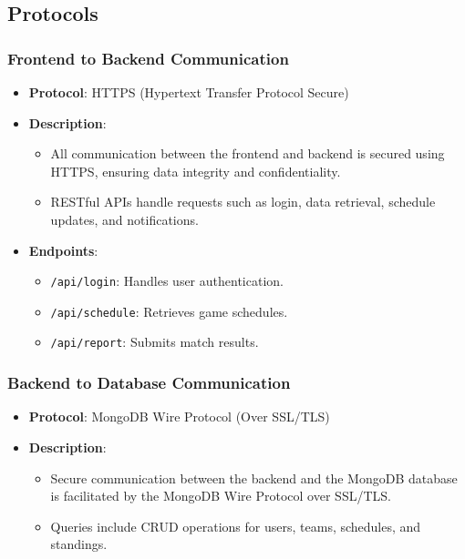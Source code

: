 \documentclass[12pt, titlepage]{article}
\begin{document}
\subsection*{Protocols}

\subsubsection*{Frontend to Backend Communication}
\begin{itemize}
    \item \textbf{Protocol}: HTTPS (Hypertext Transfer Protocol Secure)
    \item \textbf{Description}:
    \begin{itemize}
        \item All communication between the frontend and backend is secured using HTTPS, ensuring data integrity and confidentiality.
        \item RESTful APIs handle requests such as login, data retrieval, schedule updates, and notifications.
    \end{itemize}
    \item \textbf{Endpoints}:
    \begin{itemize}
        \item \texttt{/api/login}: Handles user authentication.
        \item \texttt{/api/schedule}: Retrieves game schedules.
        \item \texttt{/api/report}: Submits match results.
    \end{itemize}
\end{itemize}

\subsubsection*{Backend to Database Communication}
\begin{itemize}
    \item \textbf{Protocol}: MongoDB Wire Protocol (Over SSL/TLS)
    \item \textbf{Description}:
    \begin{itemize}
        \item Secure communication between the backend and the MongoDB database is facilitated by the MongoDB Wire Protocol over SSL/TLS.
        \item Queries include CRUD operations for users, teams, schedules, and standings.
    \end{itemize}
\end{itemize}
\end{document}
